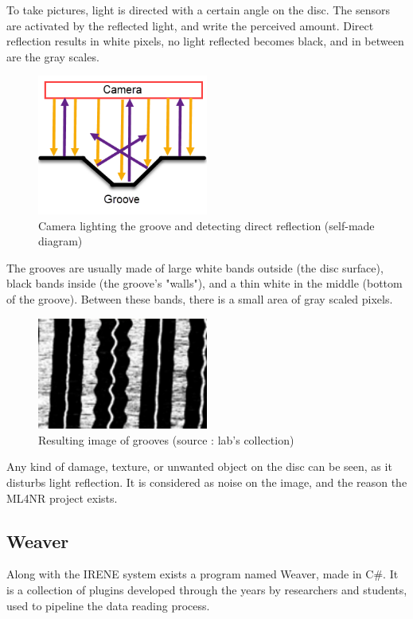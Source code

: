\documentclass[12pt, twoside]{article}
\begin{document}
To take pictures, light is directed with a certain angle on the disc. The sensors are activated by the reflected light, and write the perceived amount. Direct reflection results in white pixels, no light reflected becomes black, and in between are the gray scales.
\begin{figure}[H]
	\centering
	\includegraphics[width=0.5\textwidth]{../images/grooveside.png}
	\caption{Camera lighting the groove and detecting direct reflection (self-made diagram)}
	\label{grooveside}
\end{figure}
The grooves are usually made of large white bands outside (the disc surface), black bands inside (the groove's "walls"), and a thin white in the middle (bottom of the groove). Between these bands, there is a small area of gray scaled pixels.
\begin{figure}[H]
	\centering
	\includegraphics[width=0.5\textwidth]{../images/groove.png}
	\caption{Resulting image of grooves (source : lab's collection)}
	\label{groove}
\end{figure}
Any kind of damage, texture, or unwanted object on the disc can be seen, as it disturbs light reflection. It is considered as noise on the image, and the reason the ML4NR project exists.
\subsection{Weaver}
Along with the IRENE system exists a program named Weaver, made in C\#. It is a collection of plugins developed through the years by researchers and students, used to pipeline the data reading process. 
\end{document}
